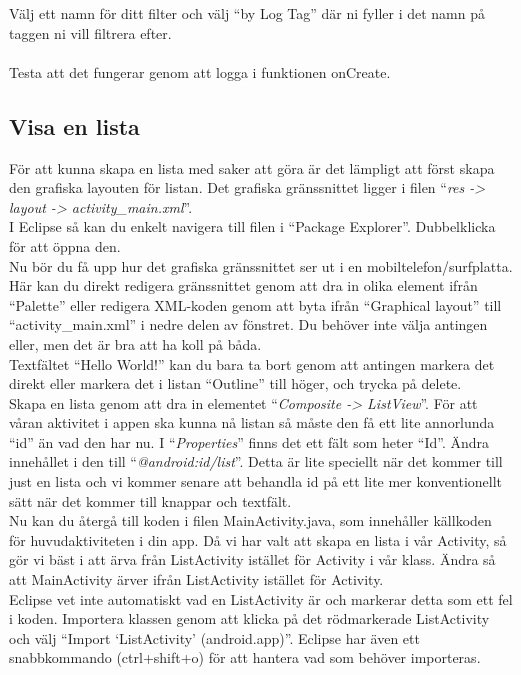\documentclass[11 pt, titlepage]{article} %
\begin{document}
Välj ett namn för ditt filter och välj “by Log Tag” där ni fyller i det namn på taggen ni vill filtrera efter.\\ \\
Testa att det fungerar genom att logga i funktionen onCreate.


\subsection{Visa en lista}
För att kunna skapa en lista med saker att göra är det lämpligt att först skapa den grafiska layouten för listan. Det grafiska gränssnittet ligger i filen “\textit{res -> layout -> activity\_main.xml}”.\\
I Eclipse så kan du enkelt navigera till filen i “Package Explorer”. Dubbelklicka för att öppna den.\\

Nu bör du få upp hur det grafiska gränssnittet ser ut i en mobiltelefon/surfplatta. Här kan du direkt redigera gränssnittet genom att dra in olika element ifrån “Palette” eller redigera XML-koden genom att byta ifrån “Graphical layout” till “activity\_main.xml” i nedre delen av fönstret. Du behöver inte välja antingen eller, men det är bra att ha koll på båda.\\

Textfältet “Hello World!” kan du bara ta bort genom att antingen markera det direkt eller markera det i listan “Outline” till höger, och trycka på delete.\\ 

Skapa en lista genom att dra in elementet “\textit{Composite -> ListView}”. För att våran aktivitet i appen ska kunna nå listan så måste den få ett lite annorlunda “id” än vad den har nu. I “\textit{Properties}” finns det ett fält som heter “Id”. Ändra innehållet i den till “\textit{@android:id/list}”. Detta är lite speciellt när det kommer till just en lista och vi kommer senare att behandla id på ett lite mer konventionellt sätt när det kommer till knappar och textfält.\\

Nu kan du återgå till koden i filen MainActivity.java, som innehåller källkoden för huvudaktiviteten i din app.
Då vi har valt att skapa en lista i vår Activity, så gör vi bäst i att ärva från ListActivity istället för Activity i vår klass.
Ändra så att MainActivity ärver ifrån ListActivity istället för Activity. \\

Eclipse vet inte automatiskt vad en ListActivity är och markerar detta som ett fel i koden. Importera klassen genom att klicka på det rödmarkerade ListActivity och välj “Import ‘ListActivity’ (android.app)”. Eclipse har även ett snabbkommando (ctrl+shift+o) för att hantera vad som behöver importeras.\\
\end{document}
